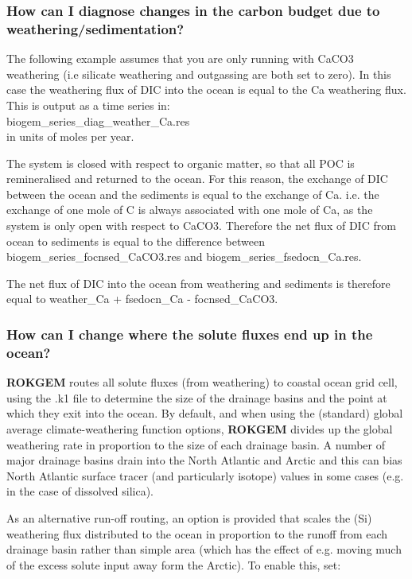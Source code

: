 \documentclass[11pt,fleqn]{book} %
\begin{document}
\subsubsection{How can I diagnose changes in the carbon budget due to weathering/sedimentation?}

The following example assumes that you are only running with CaCO3 weathering (i.e silicate weathering and outgassing are both set to zero). In this case the weathering flux of DIC into the ocean is equal to the Ca weathering flux. This is output as a time series in:
\\\textsf{\footnotesize biogem\_series\_diag\_weather\_Ca.res}
\\\noindent in units of moles per year.

The system is closed with respect to organic matter, so that all POC is remineralised and returned to the ocean. For this reason, the exchange of DIC between the ocean and the sediments is equal to the exchange of Ca. i.e. the exchange of one mole of C is always associated with one mole of Ca, as the system is only open with respect to CaCO3. Therefore the net flux of DIC from ocean to sediments is equal to the difference between biogem\_series\_focnsed\_CaCO3.res and biogem\_series\_fsedocn\_Ca.res.

The net flux of DIC into the ocean from weathering and sediments is therefore equal to weather\_Ca + fsedocn\_Ca - focnsed\_CaCO3.

%
\subsubsection{How can I change where the solute fluxes end up in the ocean?}

\textbf{ROKGEM} routes all solute fluxes (from weathering) to coastal ocean grid cell, using the \textsf{\footnotesize .k1} file to determine the size of the drainage basins and the point at which they exit into the ocean. By default, and when using the (standard) global average climate-weathering function options, \textbf{ROKGEM} divides up the global weathering rate in proportion to the size of each drainage basin. A number of major drainage basins drain into the North Atlantic and Arctic and this can bias North Atlantic surface tracer (and particularly isotope) values in some cases (e.g. in the case of dissolved silica).

As an alternative run-off routing, an option is provided that scales the (Si) weathering flux distributed to the ocean in proportion to the runoff from each drainage basin rather than simple area (which has the effect of e.g. moving much of the excess solute input away form the Arctic). To enable this, set:
\end{document}
